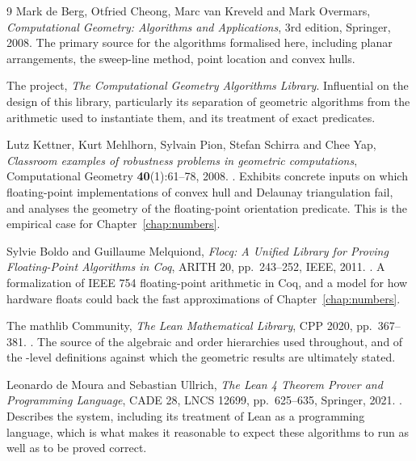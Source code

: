 
\begin{thebibliography}{9}
 Mark de Berg, Otfried Cheong, Marc van Kreveld and Mark Overmars,
  \emph{Computational Geometry: Algorithms and Applications}, 3rd edition,
  Springer, 2008. The primary source for the algorithms formalised here,
  including planar arrangements, the sweep-line method, point location and
  convex hulls.

 The  project, \emph{The Computational
  Geometry Algorithms Library}. Influential on the design of this library,
  particularly its separation of geometric algorithms from the arithmetic
  used to instantiate them, and its treatment of exact predicates.

 Lutz Kettner, Kurt Mehlhorn, Sylvain Pion, Stefan Schirra and Chee Yap,
  \emph{Classroom examples of robustness problems in geometric computations},
  Computational Geometry \textbf{40}(1):61--78, 2008.
  .
  Exhibits concrete inputs on which floating-point implementations of convex
  hull and Delaunay triangulation fail, and analyses the geometry of the
  floating-point orientation predicate. This is the empirical case for
  Chapter~\ref{chap:numbers}.

 Sylvie Boldo and Guillaume Melquiond, \emph{Flocq: A Unified Library for
  Proving Floating-Point Algorithms in Coq}, ARITH 20, pp.\ 243--252, IEEE, 2011.
  .
  A formalization of IEEE 754 floating-point arithmetic in Coq, and a model for
  how hardware floats could back the fast approximations of
  Chapter~\ref{chap:numbers}.

 The mathlib Community, \emph{The Lean Mathematical Library}, CPP 2020,
  pp.\ 367--381.
  .
  The source of the algebraic and order hierarchies used throughout, and of the
  -level definitions against which the geometric results are
  ultimately stated.

 Leonardo de Moura and Sebastian Ullrich, \emph{The Lean 4 Theorem Prover
  and Programming Language}, CADE 28, LNCS 12699, pp.\ 625--635, Springer, 2021.
  .
  Describes the system, including its treatment of Lean as a programming
  language, which is what makes it reasonable to expect these algorithms to run
  as well as to be proved correct.


\end{thebibliography}
